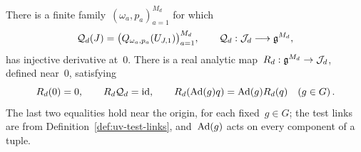 \begin{lemma}\label{lem:uv-sampling}
There is a finite family~$(\omega_a,p_a)_{a=1}^{M_d}$ for which
\begin{equation}\label{eq:uv-sampler}
 \mathcal Q_d(J)=\bigl(Q_{\omega_a,p_a}(U_{J,1})\bigr)_{a=1}^{M_d},
 \qquad \mathcal Q_d:\mathcal J_d\longrightarrow\mathfrak g^{M_d},
\end{equation}
has injective derivative at~$0$.
There is a real analytic map~$R_d:\mathfrak g^{M_d}\to\mathcal J_d$, defined near~$0$, satisfying
\begin{equation}\label{eq:uv-recovery}
 R_d(0)=0,\qquad R_d\mathcal Q_d=\mathrm{id},\qquad
 R_d(\operatorname{Ad}(g)q)=\operatorname{Ad}(g)R_d(q)\quad(g\in G)\,.
\end{equation}
The last two equalities hold near the origin, for each fixed~$g\in G$; the test links are from Definition~\ref{def:uv-test-links}, and~$\operatorname{Ad}(g)$ acts on every component of a tuple.
\end{lemma}

